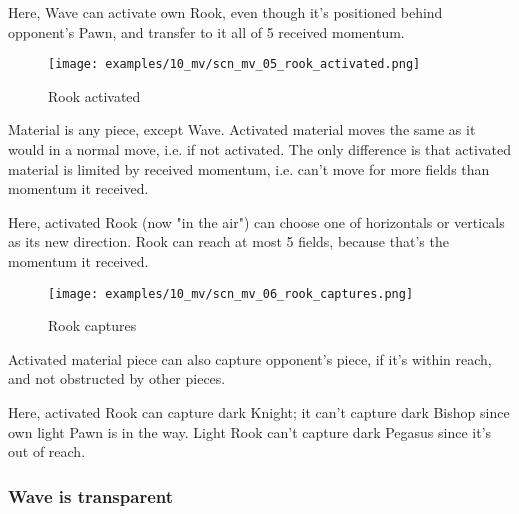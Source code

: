 Here, Wave can activate own Rook, even though it's positioned behind opponent's
Pawn, and transfer to it all of 5 received momentum.

\clearpage %

\vspace*{-2.1\baselineskip}
\noindent
\begin{figure}[!h]
\texttt{[image: examples/10\_mv/scn\_mv\_05\_rook\_activated.png]}
\vspace*{-1.3\baselineskip}
\caption{Rook activated}
\label{fig:scn_mv_05_rook_activated}
\end{figure}

\vspace*{-0.3\baselineskip}
Material is any piece, except Wave. Activated material moves the same as it would
in a normal move, i.e. if not activated. The only difference is that activated
material is limited by received momentum, i.e. can't move for more fields than
momentum it received.

Here, activated Rook (now "in the air") can choose one of horizontals or verticals
as its new direction. Rook can reach at most 5 fields, because that's the momentum
it received.

\clearpage %

\vspace*{-2.1\baselineskip}
\noindent
\begin{figure}[!h]
\texttt{[image: examples/10\_mv/scn\_mv\_06\_rook\_captures.png]}
\caption{Rook captures}
\label{fig:scn_mv_06_rook_captures}
\end{figure}

Activated material piece can also capture opponent's piece, if it's within reach,
and not obstructed by other pieces.

Here, activated Rook can capture dark Knight; it can't capture dark Bishop since
own light Pawn is in the way. Light Rook can't capture dark Pegasus since it's out
of reach.

\clearpage %

\subsubsection*{Wave is transparent}
\label{sec:Miranda's veil/Wave/Cascading Waves/Wave is transparent}

